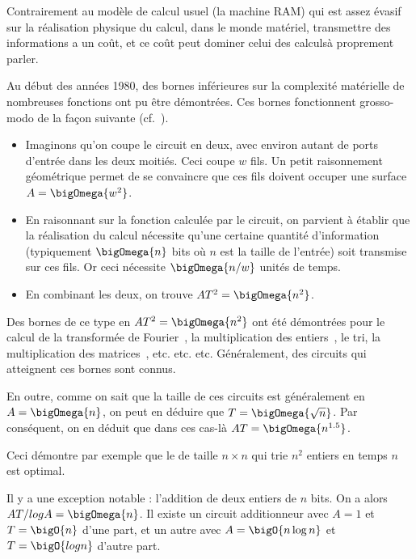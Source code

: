 Contrairement au modèle de calcul usuel (la machine RAM) qui est assez évasif
sur la réalisation physique du calcul, dans le monde matériel, transmettre des
informations a un coût, et ce coût peut dominer celui des \og calculs\fg à
proprement parler.

Au début des années 1980, des bornes inférieures sur la complexité matérielle de
nombreuses fonctions ont pu être démontrées. Ces bornes fonctionnent grosso-modo
de la façon suivante (cf.~\cite{Thompson79}).

\begin{itemize}  
\item Imaginons qu'on coupe le circuit en deux, avec environ autant de ports
  d'entrée dans les deux moitiés. Ceci coupe $w$ fils. Un petit raisonnement
  géométrique permet de se convaincre que ces fils doivent occuper une surface
  $A = \bigOmega{w^2}$.

\item En raisonnant sur la fonction calculée par le circuit, on parvient à
  établir que la réalisation du calcul nécessite qu'une certaine quantité
  d'information (typiquement $\bigOmega{n}$ bits où $n$ est la taille de
  l'entrée) soit transmise sur ces fils. Or ceci nécessite $\bigOmega{n/w}$
  unités de temps.

\item En combinant les deux, on trouve $AT^2 = \bigOmega{n^2}$.
\end{itemize}

\medskip

Des bornes de ce type en $AT^2 = \bigOmega{n^2}$ ont été démontrées pour le
calcul de la transformée de Fourier~\cite{Thompson79}, la multiplication des
entiers~\cite{BrentK80}, le tri, la multiplication des matrices~\cite{Savage81},
etc. etc. etc. Généralement, des circuits qui atteignent ces bornes sont
connus.

En outre, comme on sait que la taille de ces circuits est généralement en
$A = \bigOmega{n}$, on peut en déduire que $T = \bigOmega{\sqrt{n}}$. Par
conséquent, on en déduit que dans ces cas-là $AT = \bigOmega{n^{1.5}}$.

Ceci démontre par exemple que le  de taille $n \times n$ qui trie
$n^2$ entiers en temps $n$ est optimal.

Il y a une exception notable : l'addition de deux entiers de $n$ bits. On a
alors $AT / log A = \bigOmega{n}$. Il existe un circuit additionneur avec $A=1$
et $T=\bigO{n}$ d'une part, et un autre avec $A = \bigO{n \log n}$ et
$T = \bigO{log n}$ d'autre part.

